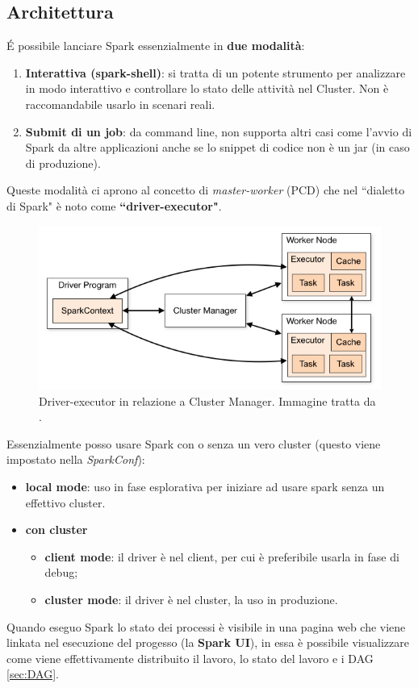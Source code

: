 \documentclass[12pt,italian]{article}
\begin{document}
\subsection{Architettura}
É possibile lanciare Spark essenzialmente in \textbf{due modalità}:
\begin{enumerate}
	\item \textbf{Interattiva (spark-shell)}: si tratta di un potente strumento per analizzare in modo interattivo e controllare lo stato delle attività nel Cluster. Non è raccomandabile usarlo in scenari reali.
	\item \textbf{Submit di un job}: da command line, non supporta altri casi come l'avvio di Spark da altre applicazioni anche se lo snippet di codice non è un jar (in caso di produzione).
\end{enumerate}
Queste modalità ci aprono al concetto di \textit{master-worker} (PCD) che nel ``dialetto di Spark" è noto come \textbf{``driver-executor"}.
\begin{figure}
	\centering 
	\includegraphics[width=0.8\linewidth]{img/cluster-overview.png}
	\caption{Driver-executor in relazione a Cluster Manager. Immagine tratta da \cite{spark}.}
	\label{fig:driverexecutor}
\end{figure}
Essenzialmente posso usare Spark con o senza un vero cluster (questo viene impostato nella \textit{SparkConf}):
\begin{itemize}
	\item \textbf{local mode}: uso in fase esplorativa per iniziare ad usare spark senza un effettivo cluster.
	\item \textbf{con cluster}
	\begin{itemize}
		\item \textbf{client mode}: il driver è nel client, per cui è preferibile usarla in fase di debug;
		\item \textbf{cluster mode}: il driver è nel cluster, la uso in produzione.
	\end{itemize}
\end{itemize}
Quando eseguo Spark lo stato dei processi è visibile in una pagina web che viene linkata nel esecuzione del progesso (la \textbf{Spark UI}), in essa è possibile visualizzare come viene effettivamente distribuito il lavoro, lo stato del lavoro e i DAG \ref{sec:DAG}. 
\end{document}
